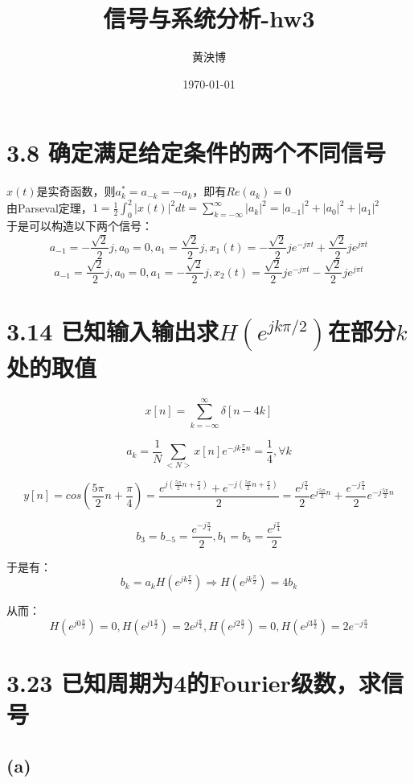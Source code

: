\documentclass[UTF8,fontset=fandol,12pt,a4paper]{ctexart}
\title{信号与系统分析-hw3}
\author{黄泱博\quad2024012867}
\date{\today}
\begin{document}
\maketitle

\section*{3.8 确定满足给定条件的两个不同信号}

\noindent $x(t)$是实奇函数，则$a_k^*=a_{-k}=-a_k$，即有$Re(a_k)=0$ \\
由Parseval定理，$1=\frac{1}{2}\int_{0}^{2}|x(t)|^2dt=\sum_{k=-\infty}^{\infty}|a_k|^2=|a_{-1}|^2+|a_0|^2+|a_1|^2$\\
于是可以构造以下两个信号：
\[a_{-1}=-\frac{\sqrt2}{2}j,a_0=0,a_1=\frac{\sqrt2}{2}j, x_1(t)=-\frac{\sqrt2}{2}je^{-j\pi t}+\frac{\sqrt2}{2}je^{j\pi t}\]
\[a_{-1}=\frac{\sqrt2}{2}j,a_0=0,a_1=-\frac{\sqrt2}{2}j, x_2(t)=\frac{\sqrt2}{2}je^{-j\pi t}-\frac{\sqrt2}{2}je^{j\pi t}\]

\section*{3.14 已知输入输出求$H(e^{jk\pi /2})$在部分$k$处的取值}

$$x[n]=\sum_{k=-\infty}^{\infty}\delta[n-4k]$$

$$a_k=\frac{1}{N}\sum_{<N>}x[n]e^{-jk\frac{\pi}{2}n}=\frac{1}{4},\forall k$$

$$y[n]=cos(\frac{5\pi}{2}n+\frac{\pi}{4})=\frac{e^{j(\frac{5\pi}{2}n+\frac{\pi}{4})}+e^{-j(\frac{5\pi}{2}n+\frac{\pi}{4})}}{2}=\frac{e^{j\frac{\pi}{4}}}{2}e^{j\frac{5\pi}{2}n}+\frac{e^{-j\frac{\pi}{4}}}{2}e^{-j\frac{5\pi}{2}n}$$

\[b_3=b_{-5}=\frac{e^{-j\frac{\pi}{4}}}{2},b_1=b_5=\frac{e^{j\frac{\pi}{4}}}{2}\]

于是有：
$$b_k=a_k H(e^{jk\frac{\pi}{2}}) \Rightarrow H(e^{jk\frac{\pi}{2}})=4b_k$$

从而：
\[H(e^{j0\frac{\pi}{2}})=0,H(e^{j1\frac{\pi}{2}})=2e^{j\frac{\pi}{4}},H(e^{j2\frac{\pi}{2}})=0,H(e^{j3\frac{\pi}{2}})=2e^{-j\frac{\pi}{4}}\]

\section*{3.23 已知周期为4的Fourier级数，求信号}

\subsection*{(a)}
\end{document}
